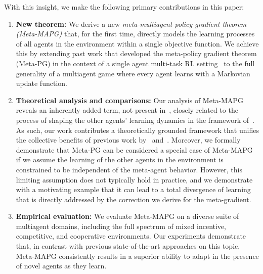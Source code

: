 \noindent{} With this insight, we make the following primary contributions in this paper:
\begin{enumerate}[leftmargin=*, wide, labelindent=0pt, topsep=0pt, label=\arabic*)]
    \itemsep0em 
    \item \textbf{New theorem:} We derive a new \textit{meta-multiagent policy gradient theorem (Meta-MAPG)} that, for the first time, directly models the learning processes of all agents in the environment within a single objective function. We achieve this by extending past work that developed the meta-policy gradient theorem (Meta-PG) in the context of a single agent multi-task RL setting~\citep{alshedivat2018continuous} to the full generality of a multiagent game where every agent learns with a Markovian update function.
    \item \textbf{Theoretical analysis and comparisons:} Our analysis of Meta-MAPG reveals an inherently added term, not present in~\citet{alshedivat2018continuous}, closely related to the process of shaping the other agents' learning dynamics in the framework of~\citet{foerster17lola}. 
    As such, our work 
    contributes a theoretically grounded framework that unifies the collective benefits of previous work by~\citet{alshedivat2018continuous} and~\citet{foerster17lola}. 
    Moreover, we formally demonstrate that Meta-PG can be considered a special case of Meta-MAPG if we assume the learning of the other agents in the environment is constrained to be independent of the meta-agent behavior. 
    However, this limiting assumption does not typically hold in practice, and we demonstrate with a motivating example that it can lead to a total divergence of learning that is directly addressed by the correction we derive for the meta-gradient. 
    \item \textbf{Empirical evaluation:} We evaluate Meta-MAPG on a diverse suite of multiagent domains, including the full spectrum of mixed incentive, competitive, and cooperative environments. 
    Our experiments demonstrate that, in contrast with previous state-of-the-art approaches on this topic, Meta-MAPG consistently results in a superior ability to adapt in the presence of novel agents as they learn.
\end{enumerate}